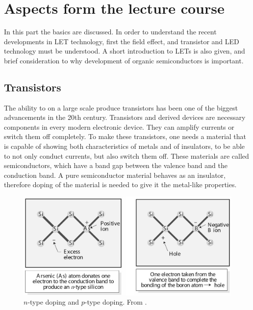 \section{Aspects form the lecture course}
% 
In this part the basics are discussed. In order to understand the recent developments in LET technology, first the field effect, and transistor and LED technology must be understood. A short introduction to LETs is also given, and brief consideration to why development of organic semiconductors is important.
 
\subsection{Transistors}

The ability to on a large scale produce transistors has been one of the biggest advancements in the 20th century. Transistors and derived devices are necessary components in every modern electronic device. They can amplify currents or switch them off completely. To make these transistors, one needs a material that is capable of showing both characteristics of metals and of insulators, to be able to not only conduct currents, but also switch them off. These materials are called semiconductors, which have a band gap between the valence band and the conduction band. A pure semiconductor material behaves as an insulator, therefore doping of the material is needed to give it the metal-like properties.

\begin{figure}[!ht]
 \begin{center}
  \includegraphics[width=1\textwidth]{doping}
  \caption{$n$-type doping and $p$-type doping. From \citet{vanweesbook}.}
  \label{fig:doping}
 \end{center}
\end{figure}

